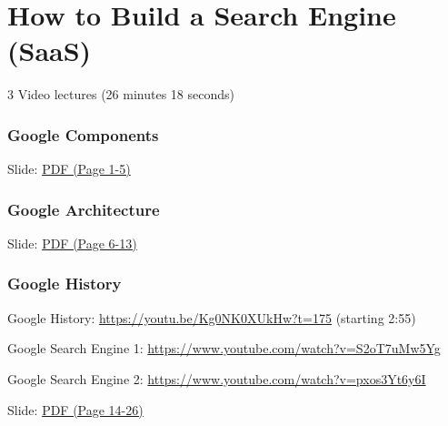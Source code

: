 \part{How to Build a Search Engine
(SaaS)}

  3 Video lectures (26 minutes 18 seconds)

\section{Google Components}


  Slide:
  \href{https://drive.google.com/open?id=0B88HKpainTSfYWZ0dDlrNThkVms}{PDF
  (Page 1-5)}

\section{Google Architecture}


  Slide:
  \href{https://drive.google.com/open?id=0B88HKpainTSfYWZ0dDlrNThkVms}{PDF
  (Page 6-13)}

\section{Google History}

  Google History: \url{https://youtu.be/Kg0NK0XUkHw?t=175}  (starting 2:55)

  Google Search Engine 1: \url{https://www.youtube.com/watch?v=S2oT7uMw5Yg}

  Google Search Engine 2: \url{https://www.youtube.com/watch?v=pxos3Yt6y6I}



  Slide:
  \href{https://drive.google.com/open?id=0B88HKpainTSfYWZ0dDlrNThkVms}{PDF
  (Page 14-26)}

